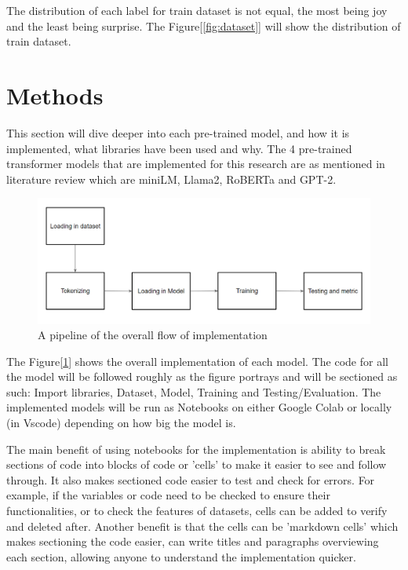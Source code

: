 The distribution of each label for train dataset is not equal, the most being joy and the least being surprise. The Figure[\ref{fig:dataset}] will show the distribution of train dataset. 

\section{Methods}

This section will dive deeper into each pre-trained model, and how it is implemented, what libraries have been used and why. The 4 pre-trained transformer models that are implemented for this research are as mentioned in literature review which are miniLM, Llama2, RoBERTa and GPT-2.

\begin{figure}[ht]
    \centerline{\includegraphics[scale=0.45]{Figures/problem_pipeline.png}}
    \caption{A pipeline of the overall flow of implementation}
    \label{fig:pipeline}
\end{figure}

The Figure[\ref{fig:pipeline}] shows the overall implementation of each model. The code for all the model will be followed roughly as the figure portrays and will be sectioned as such: Import libraries, Dataset, Model, Training and Testing/Evaluation. The implemented models will be run as Notebooks on either Google Colab or locally (in Vscode) depending on how big the model is.

The main benefit of using notebooks for the implementation is ability to break sections of code into blocks of code or 'cells' to make it easier to see and follow through. It also makes sectioned code easier to test and check for errors. For example, if the variables or code need to be checked to ensure their functionalities, or to check the features of datasets, cells can be added to verify and deleted after. Another benefit is that the cells can be 'markdown cells' which makes sectioning the code easier, can write titles and paragraphs overviewing each section, allowing anyone to understand the implementation quicker.

